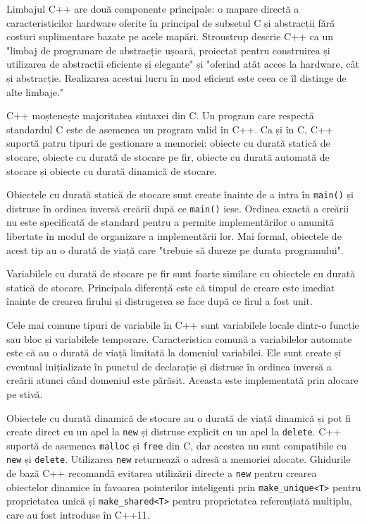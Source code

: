 \documentclass[a4paper,12pt]{report}
\begin{document}
Limbajul C++ are două componente principale: o mapare directă a caracteristicilor hardware oferite în principal de subsetul C și abstracții fără costuri suplimentare bazate pe acele mapări. Stroustrup descrie C++ ca un "limbaj de programare de abstracție ușoară, proiectat pentru construirea și utilizarea de abstracții eficiente și elegante" și "oferind atât acces la hardware, cât și abstracție. Realizarea acestui lucru în mod eficient este ceea ce îl distinge de alte limbaje."

C++ moștenește majoritatea sintaxei din C. Un program care respectă standardul C este de asemenea un program valid în C++. Ca și în C, C++ suportă patru tipuri de gestionare a memoriei: obiecte cu durată statică de stocare, obiecte cu durată de stocare pe fir, obiecte cu durată automată de stocare și obiecte cu durată dinamică de stocare.

Obiectele cu durată statică de stocare sunt create înainte de a intra în \texttt{main()} și distruse în ordinea inversă creării după ce \texttt{main()} iese. Ordinea exactă a creării nu este specificată de standard pentru a permite implementărilor o anumită libertate în modul de organizare a implementării lor. Mai formal, obiectele de acest tip au o durată de viață care "trebuie să dureze pe durata programului".

Variabilele cu durată de stocare pe fir sunt foarte similare cu obiectele cu durată statică de stocare. Principala diferență este că timpul de creare este imediat înainte de crearea firului și distrugerea se face după ce firul a fost unit.

Cele mai comune tipuri de variabile în C++ sunt variabilele locale dintr-o funcție sau bloc și variabilele temporare. Caracteristica comună a variabilelor automate este că au o durată de viață limitată la domeniul variabilei. Ele sunt create și eventual inițializate în punctul de declarație și distruse în ordinea inversă a creării atunci când domeniul este părăsit. Aceasta este implementată prin alocare pe stivă.

Obiectele cu durată dinamică de stocare au o durată de viață dinamică și pot fi create direct cu un apel la \texttt{new} și distruse explicit cu un apel la \texttt{delete}. C++ suportă de asemenea \texttt{malloc} și \texttt{free} din C, dar acestea nu sunt compatibile cu \texttt{new} și \texttt{delete}. Utilizarea \texttt{new} returnează o adresă a memoriei alocate. Ghidurile de bază C++ recomandă evitarea utilizării directe a \texttt{new} pentru crearea obiectelor dinamice în favoarea pointerilor inteligenți prin \texttt{make\_unique<T>} pentru proprietatea unică și \texttt{make\_shared<T>} pentru proprietatea referențiată multiplu, care au fost introduse în C++11.
\end{document}
